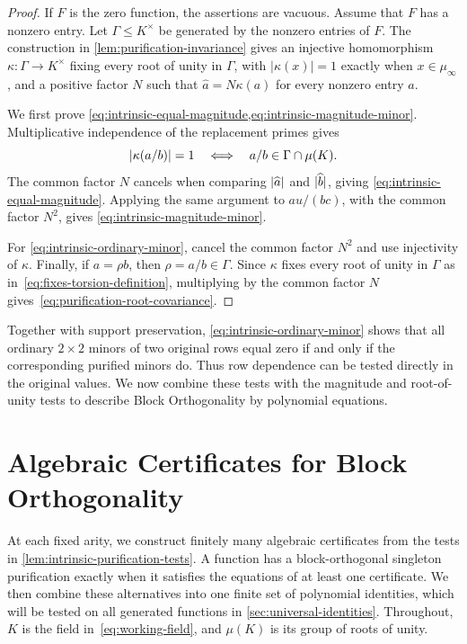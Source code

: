 \documentclass[11pt,letterpaper,onecolumn]{article}
\theoremstyle{plain}
\theoremstyle{definition}
\theoremstyle{remark}
\DeclarePairedDelimiter{\abs}{\lvert}{\rvert}
\begin{document}
\begin{proof}
If $F$ is the zero function, the assertions are vacuous.  Assume that $F$ has a
nonzero entry.
Let $\Gamma\le K^\times$ be generated by the nonzero entries of $F$.
The construction in \cref{lem:purification-invariance} gives an injective
homomorphism $\kappa:\Gamma\to K^\times$ fixing every root of unity in
$\Gamma$, with $|\kappa(x)|=1$ exactly when $x\in\mu_\infty$, and a positive factor
$N$ such that $\widehat a=N\kappa(a)$ for every nonzero entry $a$.

We first prove \cref{eq:intrinsic-equal-magnitude,eq:intrinsic-magnitude-minor}.
Multiplicative independence of the replacement primes gives
\[
  \abs{\kappa(a/b)}=1
  \quad\Longleftrightarrow\quad
  a/b\in\Gamma\cap\mu(K).
\]
The common factor $N$ cancels when comparing
$\abs{\widehat a}$ and $\abs{\widehat b}$, giving
\eqref{eq:intrinsic-equal-magnitude}.  Applying the same argument to
$au/(bc)$, with the common factor $N^2$, gives
\eqref{eq:intrinsic-magnitude-minor}.

For \eqref{eq:intrinsic-ordinary-minor}, cancel the common factor $N^2$
and use injectivity of $\kappa$.  Finally, if $a=\rho b$, then
$\rho=a/b\in\Gamma$.  Since $\kappa$ fixes every root of unity in $\Gamma$
as in~\eqref{eq:fixes-torsion-definition}, multiplying by the common factor
$N$ gives~\eqref{eq:purification-root-covariance}.
\end{proof}

Together with support preservation, \eqref{eq:intrinsic-ordinary-minor}
shows that all ordinary $2\times2$ minors of two original rows equal zero
if and only if the corresponding purified minors do.  Thus row dependence
can be tested directly in the original values.  We now combine these
tests with the magnitude and root-of-unity tests to describe
Block Orthogonality by polynomial equations.

\section{Algebraic Certificates for Block Orthogonality}
\label{sec:bo-certificates}

At each fixed arity, we construct finitely many algebraic certificates
from the tests in \cref{lem:intrinsic-purification-tests}.  A function has
a block-orthogonal singleton purification exactly when it satisfies the
equations of at least one certificate.  We then combine these alternatives
into one finite set of polynomial identities, which will be tested on all
generated functions in \cref{sec:universal-identities}.  Throughout, $K$
is the field in~\eqref{eq:working-field}, and $\mu(K)$ is its group of
roots of unity.
\end{document}
